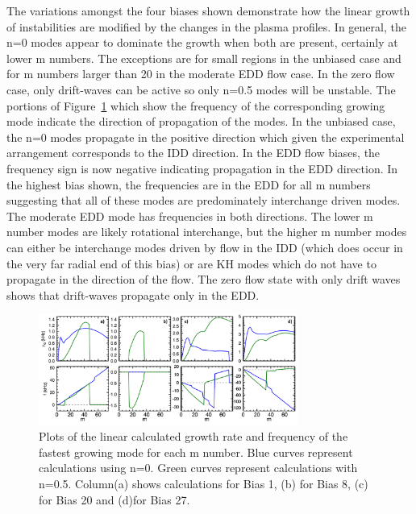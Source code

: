 \documentclass[aip,pop,amsmath,amssymb,reprint,superscriptaddress]{revtex4-1} %
\begin{document}
The variations amongst the four biases shown demonstrate how the linear growth of instabilities are modified by the changes in the plasma profiles. In general, the n=0 modes appear to dominate the growth when both are present, certainly at lower m numbers. The exceptions are for small regions in the unbiased case and for m numbers larger than 20 in the moderate EDD flow case. In the zero flow case, only drift-waves can be active so only n=0.5 modes will be unstable. The portions of Figure~\ref{fig:growth_freq_vs_mnum} which show the frequency of the corresponding growing mode indicate the direction of propagation of the modes. In the unbiased case, the n=0 modes propagate in the positive direction which given the experimental arrangement corresponds to the IDD direction. In the EDD flow biases, the frequency sign is now negative indicating propagation in the EDD direction. In the highest bias shown, the frequencies are in the EDD for all m numbers suggesting that all of these modes are predominately interchange driven modes. The moderate EDD mode has frequencies in both directions. The lower m number modes are likely rotational interchange, but the higher m number modes can either be interchange modes driven by flow in the IDD (which does occur in the very far radial end of this bias) or are KH modes which do not have to propagate in the direction of the flow. The zero flow state with only drift waves shows that drift-waves propagate only in the EDD. 

\begin{figure}[!htbp]
\centerline{
\includegraphics[width=8.5cm]{growth_freq_vs_mnum_lab}}%
\caption{\label{fig:growth_freq_vs_mnum} Plots of the linear calculated growth rate and frequency of the fastest growing mode for each m number. Blue curves represent calculations using n=0. Green curves represent calculations with n=0.5. Column(a) shows calculations for Bias 1, (b) for Bias 8, (c) for Bias 20 and (d)for Bias 27.}
\end{figure}
\end{document}

